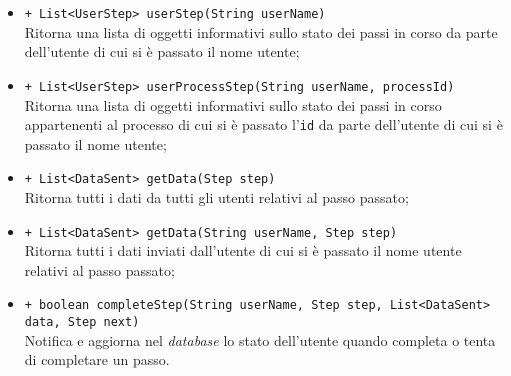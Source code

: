 \begin{flushleft}
\begin{itemize}
\begin{sloppypar}
\begin{itemize}
\item \texttt{+ List<UserStep> userStep(String userName)}\\ Ritorna una lista di oggetti informativi sullo stato dei passi in corso da parte dell'utente di cui si è passato il nome utente;
\item \texttt{+ List<UserStep> userProcessStep(String userName, processId)}\\ Ritorna una lista di oggetti informativi sullo stato dei passi in corso appartenenti al processo di cui si è passato l'\texttt{id} da parte dell'utente di cui si è passato il nome utente;
\item \texttt{+ List<DataSent> getData(Step step)}\\ Ritorna tutti i dati da tutti gli utenti relativi al passo passato;
\item \texttt{+ List<DataSent> getData(String userName, Step step)}\\ Ritorna tutti i dati inviati dall'utente di cui si è passato il nome utente relativi al passo passato;
\item \texttt{+ boolean completeStep(String userName, Step step, List<DataSent> data, Step next)}\\Notifica e aggiorna nel \textit{database} lo stato dell'utente quando completa o tenta di completare un passo.
\end{itemize}
\end{sloppypar}
\end{itemize}
\end{flushleft}
